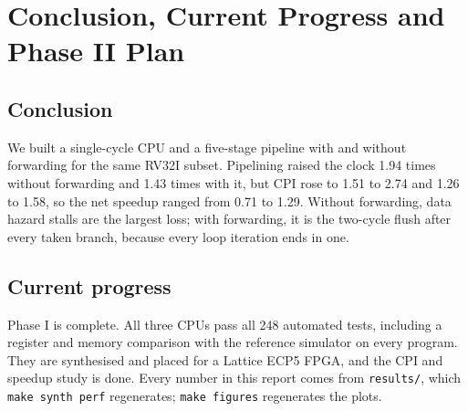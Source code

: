 \section{Conclusion, Current Progress and Phase II Plan}
\label{sec:conclusion}

\subsection{Conclusion}
We built a single-cycle CPU and a five-stage pipeline with and without
forwarding for the same RV32I subset. Pipelining raised the clock 1.94 times
without forwarding and 1.43 times with it, but CPI rose to 1.51 to 2.74 and
1.26 to 1.58, so the net speedup ranged from 0.71 to 1.29. Without
forwarding, data hazard stalls are the largest loss; with forwarding, it is
the two-cycle flush after every taken branch, because every loop iteration
ends in one.

\subsection{Current progress}
Phase I is complete. All three CPUs pass all 248 automated tests, including a
register and memory comparison with the reference simulator on every
program. They are synthesised and placed for a Lattice ECP5 FPGA, and the CPI
and speedup study is done. Every number in this report comes from
\texttt{results/}, which \texttt{make synth perf} regenerates;
\texttt{make figures} regenerates the plots.

